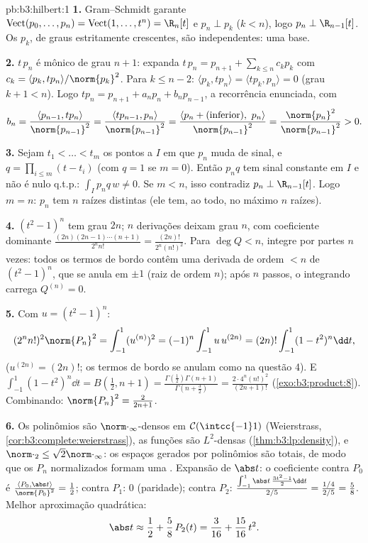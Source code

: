 \begin{solution}{pb:b3:hilbert:1}
\textbf{1.} Gram--Schmidt garante
$\operatorname{Vect}(p_0, \dots, p_n) =
\operatorname{Vect}(1, \dots, t^n) = \R_n[t]$ e $p_n \perp
p_k$ ($k < n$), logo $p_n \perp \R_{n-1}[t]$. Os $p_k$, de
graus estritamente crescentes, são independentes: uma base.

\textbf{2.} $t\,p_n$ é mônico de grau $n + 1$: expanda
$t\,p_n = p_{n+1} + \sum_{k\leq n}c_kp_k$ com $c_k =
\langle p_k, tp_n\rangle/\norm{p_k}^2$. Para $k \leq n - 2$:
$\langle p_k, tp_n\rangle = \langle tp_k, p_n\rangle = 0$
(grau $k + 1 < n$). Logo $tp_n = p_{n+1} + a_np_n +
b_np_{n-1}$, a recorrência enunciada, com
\[
b_n = \frac{\langle p_{n-1}, tp_n\rangle}{\norm{p_{n-1}}^2}
= \frac{\langle tp_{n-1}, p_n\rangle}{\norm{p_{n-1}}^2}
= \frac{\langle p_n + (\text{inferior}),\
p_n\rangle}{\norm{p_{n-1}}^2}
= \frac{\norm{p_n}^2}{\norm{p_{n-1}}^2} > 0 .
\]

\textbf{3.} Sejam $t_1 < \dots < t_m$ os pontos  a
$I$ em que $p_n$ muda de sinal, e $q = \prod_{i\leq m}(t -
t_i)$ (com $q = 1$ se $m = 0$). Então $p_nq$ tem sinal constante
em $I$ e não é nulo q.t.p.: $\int_Ip_nq\,w \neq 0$. Se $m <
n$, isso contradiz $p_n \perp \R_{n-1}[t]$. Logo $m = n$:
$p_n$ tem $n$ raízes  distintas (ele tem, ao todo, no máximo $n$
raízes).

\textbf{4.} $(t^2 - 1)^n$ tem grau $2n$; $n$ derivações
deixam grau $n$, com coeficiente dominante
$\frac{(2n)(2n-1)\cdots(n+1)}{2^nn!} =
\frac{(2n)!}{2^n(n!)^2}$. Para $\deg Q < n$, integre por partes
$n$ vezes: todos os termos de bordo contêm uma derivada de ordem
$< n$ de $(t^2-1)^n$, que se anula em $\pm1$ (raiz de ordem
$n$); após $n$ passos, o integrando carrega $Q^{(n)} = 0$.

\textbf{5.} Com $u = (t^2 - 1)^n$:
\[
(2^nn!)^2\norm{P_n}^2 = \int_{-1}^1(u^{(n)})^2
= (-1)^n\int_{-1}^1 u\,u^{(2n)}
= (2n)!\int_{-1}^1(1 - t^2)^n\dd t ,
\]
($u^{(2n)} = (2n)!$; os termos de bordo se anulam como na questão 4).
E $\int_{-1}^1(1-t^2)^n\dd t = B(\tfrac12, n+1) =
\frac{\Gamma(\frac12)\Gamma(n+1)}{\Gamma(n + \frac32)} =
\frac{2\cdot4^n(n!)^2}{(2n+1)!}$
(\cref{exo:b3:product:8}). Combinando: $\norm{P_n}^2 =
\frac{2}{2n + 1}$.

\textbf{6.} Os polinômios são $\norm\cdot_\infty$-densos em
$\mathcal C(\intcc{-1}1)$ (Weierstrass,
\cref{cor:b3:complete:weierstrass}), as funções  são
$L^2$-densas (\cref{thm:b3:lp:density}), e
$\norm\cdot_2 \leq \sqrt2\norm\cdot_\infty$: os espaços gerados por polinômios
são totais, de modo que os $P_n$ normalizados formam uma .
Expansão de $\abs t$: o coeficiente contra $P_0$ é
$\frac{\langle P_0, \abs t\rangle}{\norm{P_0}^2} = \frac12$;
contra $P_1$: $0$ (paridade); contra $P_2$:
$\frac{\int_{-1}^1\abs t\,\frac{3t^2-1}2\dd t}{2/5} =
\frac{1/4}{2/5} = \frac58$. Melhor aproximação quadrática:
\[
\abs t \approx \frac12 + \frac58\,P_2(t) = \frac{3}{16} +
\frac{15}{16}\,t^2 .
\]


\end{solution}
